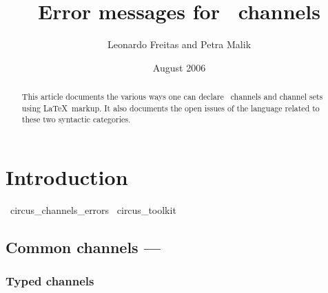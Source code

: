 \documentclass{article}
\begin{document}
\title{Error messages for \Circus\ channels}
\author{Leonardo Freitas and Petra Malik}
\date{August 2006}

\maketitle

\begin{abstract}
    \noindent This article documents the various ways one can declare \Circus\ channels and channel sets
    using \LaTeX\ markup.  It also documents the open issues of the language related to these two syntactic
    categories.
\end{abstract}

\section{Introduction}

\begin{zsection}
  \SECTION\ circus\_channels\_errors \parents\ circus\_toolkit
\end{zsection}

\subsection{Common channels --- }

\subsubsection{Typed channels}
\end{document}
